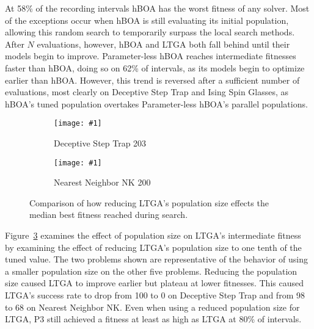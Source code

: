 \documentclass[twoside]{article}
\newcommand{\includegraphicsfit}[1]
{\texttt{[image: \#1]}}
\begin{document}
At 58\% of the recording intervals hBOA has the worst fitness of any solver. Most of the exceptions
occur when hBOA is still evaluating its initial population, allowing this random search to temporarily surpass the
local search methods. After $N$ evaluations, however, hBOA and LTGA both fall behind until their models begin
to improve.
Parameter-less hBOA reaches intermediate fitnesses faster than hBOA, doing so on 62\% of intervals, as its models begin
to optimize earlier than hBOA.  However, this trend is reversed after a sufficient number of evaluations, most clearly
on Deceptive Step Trap and Ising Spin Glasses, as hBOA's tuned population overtakes Parameter-less hBOA's parallel populations.


\begin{figure}[t]
  \begin{centering}
    \begin{subfigure}{.5\textwidth}
      \begin{centering}
        \includegraphicsfit{small-pop-dst}
      \end{centering}
      \caption{Deceptive Step Trap 203}
      \label{fig-small-pop-dst}
    \end{subfigure}%
    \begin{subfigure}{.5\textwidth}
      \begin{centering}
        \includegraphicsfit{small-pop-nk}
      \end{centering}
      \caption{Nearest Neighbor NK 200}
      \label{fig-small-pop-nk}
    \end{subfigure}
  \end{centering}
  \caption{Comparison of how reducing LTGA's population size effects
           the median best fitness reached during search.}
  \label{fig-small-pop}
\end{figure}

Figure~\ref{fig-small-pop} examines the effect of population size on LTGA's intermediate fitness by examining the effect
of reducing LTGA's population size to one tenth of the tuned value. The two problems shown are representative of the behavior of using
a smaller population size on the other five problems. Reducing the population size caused LTGA to improve earlier but plateau
at lower fitnesses. This caused LTGA's success rate to drop from 100 to 0 on Deceptive Step Trap and from 98 to 68 on Nearest
Neighbor NK.
Even when using a reduced population size for LTGA, P3 still achieved a fitness at
least as high as LTGA at 80\% of intervals.
\end{document}
